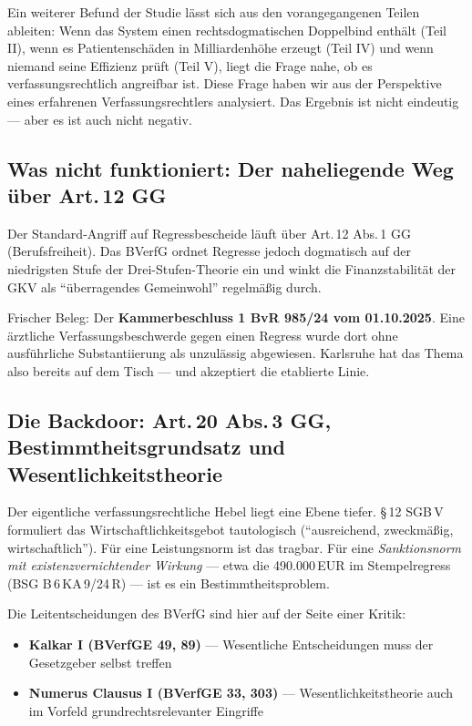\documentclass{umbruch-position}
\begin{document}
Ein weiterer Befund der Studie lässt sich aus den vorangegangenen Teilen ableiten: Wenn das System einen rechtsdogmatischen Doppelbind enthält (Teil II), wenn es Patientenschäden in Milliardenhöhe erzeugt (Teil IV) und wenn niemand seine Effizienz prüft (Teil V), liegt die Frage nahe, ob es verfassungsrechtlich angreifbar ist. Diese Frage haben wir aus der Perspektive eines erfahrenen Verfassungsrechtlers analysiert. Das Ergebnis ist nicht eindeutig — aber es ist auch nicht negativ.

\subsection{Was nicht funktioniert: Der naheliegende Weg über Art.\,12 GG}

Der Standard-Angriff auf Regressbescheide läuft über Art.\,12 Abs.\,1 GG (Berufsfreiheit). Das BVerfG ordnet Regresse jedoch dogmatisch auf der niedrigsten Stufe der Drei-Stufen-Theorie ein und winkt die Finanzstabilität der GKV als ``überragendes Gemeinwohl'' regelmäßig durch.

Frischer Beleg: Der \textbf{Kammerbeschluss 1 BvR 985/24 vom 01.10.2025}. Eine ärztliche Verfassungsbeschwerde gegen einen Regress wurde dort ohne ausführliche Substantiierung als unzulässig abgewiesen. Karlsruhe hat das Thema also bereits auf dem Tisch — und akzeptiert die etablierte Linie.

\subsection{Die Backdoor: Art.\,20 Abs.\,3 GG, Bestimmtheitsgrundsatz und Wesentlichkeitstheorie}

Der eigentliche verfassungsrechtliche Hebel liegt eine Ebene tiefer. \S\,12 SGB\,V formuliert das Wirtschaftlichkeitsgebot tautologisch (``ausreichend, zweckmäßig, wirtschaftlich''). Für eine Leistungsnorm ist das tragbar. Für eine \textit{Sanktionsnorm mit existenzvernichtender Wirkung} — etwa die 490.000\,EUR im Stempelregress (BSG B\,6\,KA\,9/24\,R) — ist es ein Bestimmtheitsproblem.

Die Leitentscheidungen des BVerfG sind hier auf der Seite einer Kritik:

\begin{itemize}[nosep]
  \item \textbf{Kalkar I (BVerfGE 49, 89)} — Wesentliche Entscheidungen muss der Gesetzgeber selbst treffen
  \item \textbf{Numerus Clausus I (BVerfGE 33, 303)} — Wesentlichkeitstheorie auch im Vorfeld grundrechtsrelevanter Eingriffe
\end{itemize}
\end{document}
